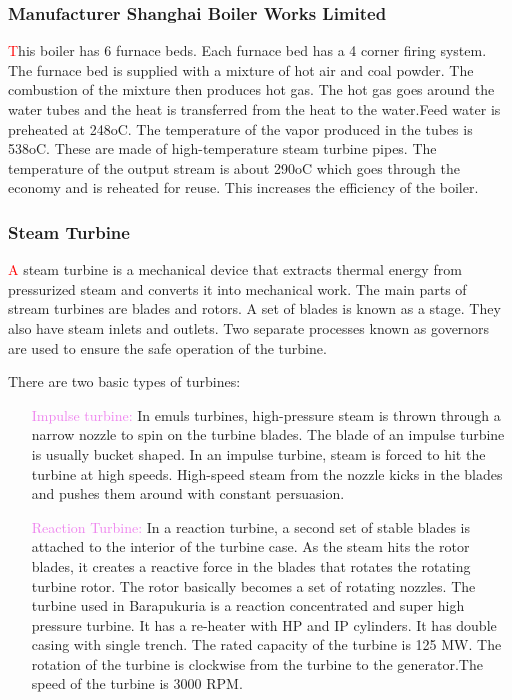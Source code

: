 \documentclass[11 pt]{article}
\begin{document}
\subsubsection{Manufacturer Shanghai Boiler Works Limited}
{\huge\textcolor{red}{\hspace{5 mm}T}}his boiler has 6 furnace beds. Each furnace bed has a 4 corner firing system. The furnace bed is supplied with a mixture of hot air and coal powder. The combustion of the mixture then produces hot gas. The hot gas goes around the water tubes and the heat is transferred from the heat to the water.Feed water is preheated at 248oC. The temperature of the vapor produced in the tubes is 538oC. These are made of high-temperature steam turbine pipes. The temperature of the output stream is about 290oC which goes through the economy and is reheated for reuse. This increases the efficiency of the boiler.

\subsubsection{Steam Turbine}
{\huge\textcolor{red}{\hspace{5 mm}A}} steam turbine is a mechanical device that extracts thermal
energy from pressurized steam and converts it into mechanical
work. The main parts of stream turbines are blades and rotors.
A set of blades is known as a stage. They also have steam inlets
and outlets. Two separate processes known as governors are
used to ensure the safe operation of the turbine.\\

\pagebreak

There are two basic types of turbines:
\begin{enumerate}
	\item [\textcolor{violet}{Impulse turbine:}]In emuls turbines, high-pressure steam is thrown through a narrow nozzle to spin on the turbine blades. The blade of an impulse turbine is usually bucket shaped. In an impulse turbine, steam is forced to hit the turbine at high speeds. High-speed steam from the nozzle kicks in the blades and pushes them around with constant persuasion.
	\item [\textcolor{violet}{Reaction Turbine:}]In a reaction turbine, a second set of stable blades is attached to the interior of the turbine case. As the steam hits the rotor blades, it creates a reactive force in the blades that rotates the rotating turbine rotor. The rotor basically becomes a set of rotating nozzles. The turbine used in Barapukuria is a reaction concentrated and super high pressure turbine. It has a re-heater with HP and IP cylinders. It has double casing with single trench. The rated capacity of the turbine is 125 MW. The rotation of the turbine is clockwise from the turbine to the generator.The speed of the turbine is 3000 RPM.
\end{enumerate}
\end{document}
